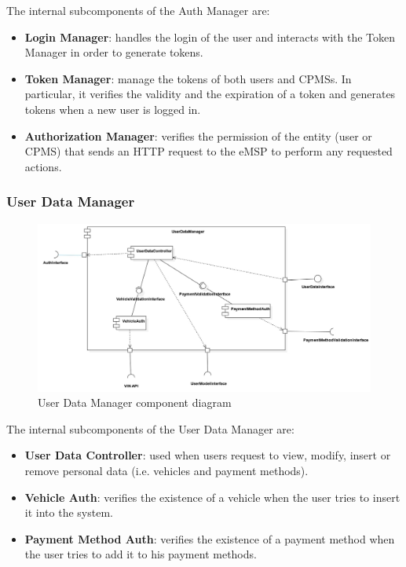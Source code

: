 \documentclass{Configuration_Files/PoliMi3i_thesis}
\begin{document}
The internal subcomponents of the Auth Manager are:
\begin{itemize}
    \item \textbf{Login Manager}: handles the login of the user and interacts with the Token Manager in order to generate tokens.
    \item \textbf{Token Manager}: manage the tokens of both users and CPMSs. In particular, it verifies the validity and the expiration of a token and generates tokens when a new user is logged in.
    \item \textbf{Authorization Manager}: verifies the permission of the entity (user or CPMS) that sends an HTTP request to the eMSP to perform any requested actions.
\end{itemize}

\subsubsection{User Data Manager}

\begin{figure}[H]
    \centering
    \includegraphics[width=1\textwidth]{Images/component/UserDataManager.jpg}
    \caption{User Data Manager component diagram}
\end{figure}

The internal subcomponents of the User Data Manager are:
\begin{itemize}
    \item \textbf{User Data Controller}: used when users request to view, modify, insert or remove personal data (i.e. vehicles and payment methods).
    \item \textbf{Vehicle Auth}: verifies the existence of a vehicle when the user tries to insert it into the system.
    \item \textbf{Payment Method Auth}: verifies the existence of a payment method when the user tries to add it to his payment methods.
\end{itemize}
\end{document}
